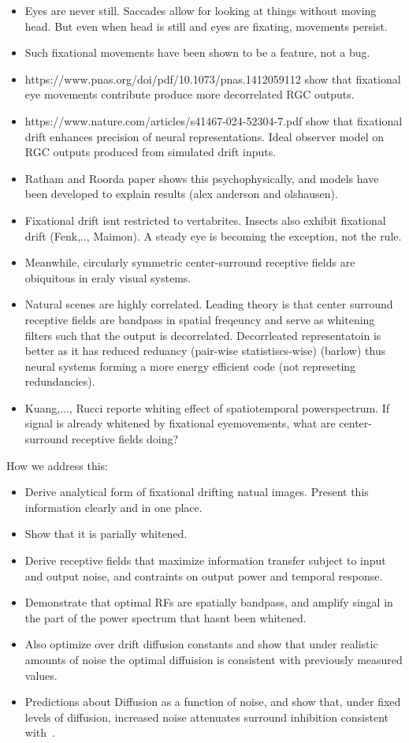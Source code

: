 \documentclass[12pt]{article}
\newcommand{\afbcomment}[1]{\textcolor{alexcolor}{#1}}
\begin{document}
\afbcomment{
\begin{itemize}
    \item Eyes are never still. Saccades allow for looking at things without moving head. But even when head is still and eyes are fixating, movements persist.
    \item Such fixational movements have been shown to be a feature, not a bug. 
    \item https://www.pnas.org/doi/pdf/10.1073/pnas.1412059112 show that fixational eye movements contribute produce more decorrelated RGC outputs. 
    \item https://www.nature.com/articles/s41467-024-52304-7.pdf show that fixational drift enhances precision of neural representations. Ideal observer model on RGC outputs produced from simulated drift inputs. 
    \item Ratham and Roorda paper shows this psychophysically, and models have been developed to explain results (alex anderson and olshausen).
    \item Fixational drift isnt restricted to vertabrites. Insects also exhibit fixational drift (Fenk,.., Maimon). A steady eye is becoming the exception, not the rule. 
    \item Meanwhile, circularly symmetric center-surround receptive fields are obiquitous in eraly visual systems. 
    \item Natural scenes are highly correlated. Leading theory is that center surround receptive fields are bandpass in spatial freqeuncy and serve as whitening filters such that the output is decorrelated. Decorrleated representatoin is better as it has reduced reduancy (pair-wise statistiscs-wise) (barlow) thus neural systems forming a more energy efficient code (not represeting redundancies).
    \item Kuang,..., Rucci reporte whiting effect of spatiotemporal powerspectrum. If signal is already whitened by fixational eyemovements, what are center-surround receptive fields doing? 
\end{itemize}
}
\afbcomment{
How we address this:
\begin{itemize}
    \item Derive analytical form of fixational drifting natual images. Present this information clearly and in one place. 
    \item Show that it is parially whitened. 
    \item Derive receptive fields that maximize information transfer subject to input and output noise, and contraints on output power and temporal response. 
    \item Demonstrate that optimal RFs are spatially bandpass, and amplify singal in the part of the power spectrum that hasnt been whitened. 
    \item Also optimize over drift diffusion constants and show that under realistic amounts of noise the optimal diffuision is consistent with previously measured values. 
    \item Predictions about Diffusion as a function of noise, and show that, under fixed levels of diffusion, increased noise attenuates surround inhibition consistent with~\cite{atick1992does}.
\end{itemize}
}
\end{document}
